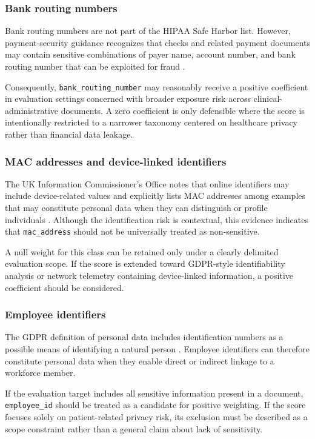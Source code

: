 \documentclass[11pt,a4paper]{article}
\begin{document}
\subsubsection{Bank routing numbers}

Bank routing numbers are not part of the HIPAA Safe Harbor list. However, payment-security guidance recognizes that checks and related payment documents may contain sensitive combinations of payer name, account number, and bank routing number that can be exploited for fraud \citep{fedpayments_check_fraud_2026}.

Consequently, \texttt{bank\_routing\_number} may reasonably receive a positive coefficient in evaluation settings concerned with broader exposure risk across clinical-administrative documents. A zero coefficient is only defensible where the score is intentionally restricted to a narrower taxonomy centered on healthcare privacy rather than financial data leakage.

\subsubsection{MAC addresses and device-linked identifiers}

The UK Information Commissioner’s Office notes that online identifiers may include device-related values and explicitly lists MAC addresses among examples that may constitute personal data when they can distinguish or profile individuals \citep{ico_identifiers_2026}. Although the identification risk is contextual, this evidence indicates that \texttt{mac\_address} should not be universally treated as non-sensitive.

A null weight for this class can be retained only under a clearly delimited evaluation scope. If the score is extended toward GDPR-style identifiability analysis or network telemetry containing device-linked information, a positive coefficient should be considered.

\subsubsection{Employee identifiers}

The GDPR definition of personal data includes identification numbers as a possible means of identifying a natural person \citep{eu_gdpr_2016}. Employee identifiers can therefore constitute personal data when they enable direct or indirect linkage to a workforce member.

If the evaluation target includes all sensitive information present in a document, \texttt{employee\_id} should be treated as a candidate for positive weighting. If the score focuses solely on patient-related privacy risk, its exclusion must be described as a scope constraint rather than a general claim about lack of sensitivity.
\end{document}

